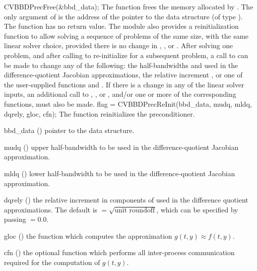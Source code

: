 {}
{
  CVBBDPrecFree(\&bbd\_data);
}
{
  The function  frees the memory allocated by
  .
}
{
  The only argument of  is the address of the pointer to the
  {\cvbbdpre} data structure (of type ).
}
{
  The function  has no return value.
}
{}
\vspace*{.3in}
The {\cvbbdpre} module also provides a reinitialization function to allow
solving  a sequence of problems of the same size, with the same linear solver
choice, provided there is no change in , , or .
After solving one problem, and after calling  to
re-initialize {\cvode} for a subsequent problem, a call to 
can be made to change any of the following: the half-bandwidths  and
 used in the difference-quotient Jacobian approximations, the relative
increment , or one of the user-supplied functions  and .
If there is a change in any of the linear solver inputs, an additional call
to , , or , and/or one or more of
the corresponding  functions, must also be made.
{
  flag = CVBBDPrecReInit(bbd\_data, mudq, mldq, dqrely, gloc, cfn);
}
{
  The function  reinitializes the {\cvbbdpre} preconditioner.
}
{
  \begin{args}
  \item[bbd\_data] ()
    pointer to the {\cvbbdpre} data structure.
  \item[mudq] ()
    upper half-bandwidth to be used in the difference-quotient Jacobian approximation.
  \item[mldq] ()
    lower half-bandwidth to be used in the difference-quotient Jacobian approximation.
  \item[dqrely] ()
    the relative increment in components of  used in the difference quotient
    approximations.  The default is  $= \sqrt{\text{unit roundoff}}$,
    which can be specified by passing  $= 0.0$.
  \item[gloc] ()
    the {\C} function which computes the approximation $g(t,y) \approx f(t,y)$. 
  \item[cfn] ()
    the optional {\C} function which performs all inter-process communication required for
    the computation of $g(t,y)$.
  \end{args}
}
